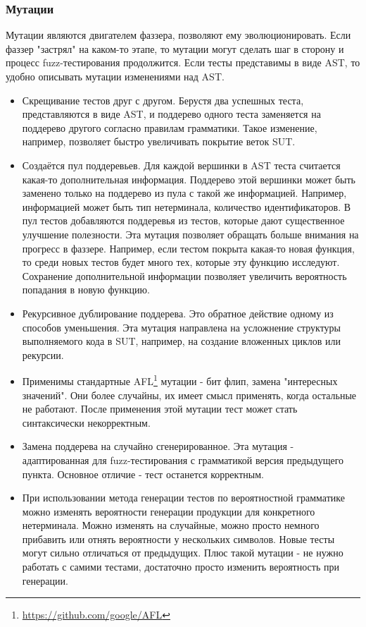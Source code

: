 \documentclass[a4paper]{article}
\begin{document}
\subsubsection{Мутации}
\indent

Мутации являются двигателем фаззера, позволяют ему эволюционировать. Если фаззер "застрял" на каком-то этапе, то мутации могут сделать шаг в сторону и процесс fuzz-тестирования продолжится. Если тесты представимы в виде AST, то удобно описывать мутации изменениями над AST. 

\begin{itemize}
\item Скрещивание тестов друг с другом\cite{litlink4}. Берустя два успешных теста, представляются в виде AST, и поддерево одного теста заменяется на поддерево другого согласно правилам грамматики. Такое изменение, например, позволяет быстро увеличивать покрытие веток SUT.   
\item Создаётся пул поддеревьев\cite{litlink3}. Для каждой вершинки в AST теста считается  какая-то дополнительная информация. Поддерево этой вершинки может быть заменено только на поддерево из пула с такой же информацией. Например, информацией может быть тип нетерминала, количество идентификаторов. В пул тестов добавляются поддеревья из тестов, которые дают существенное улучшение полезности. Эта мутация позволяет обращать больше внимания на прогресс в фаззере. Например, если тестом покрыта какая-то новая функция, то среди новых тестов будет много тех, которые эту функцию исследуют. Сохранение дополнительной информации позволяет увеличить вероятность попадания в новую функцию.
\item Рекурсивное дублирование поддерева\cite{litlink6}. Это обратное действие одному из способов уменьшения. Эта мутация направлена на усложнение структуры выполняемого кода в SUT, например, на создание вложенных циклов или рекурсии. 
\item Применимы стандартные AFL\footnote[1]{\href{https://github.com/google/AFL}{https://github.com/google/AFL}} мутации - бит флип, замена "интересных значений". Они более случайны, их имеет смысл применять, когда остальные не работают. После применения этой мутации тест может стать синтаксически некорректным.
\item Замена поддерева на случайно сгенерированное\cite{litlink6}. Эта мутация - адаптированная для fuzz-тестирования с грамматикой версия предыдущего пункта. Основное отличие - тест останется корректным.
\item При использовании метода генерации тестов по вероятностной грамматике можно изменять вероятности генерации продукции для конкретного нетерминала\cite{litlink2}. Можно изменять на случайные, можно просто немного прибавить или отнять вероятности у нескольких символов. Новые тесты могут сильно отличаться от предыдущих. Плюс такой мутации - не нужно работать с самими тестами, достаточно просто изменить вероятность при генерации.  
\end{itemize}
\end{document}
